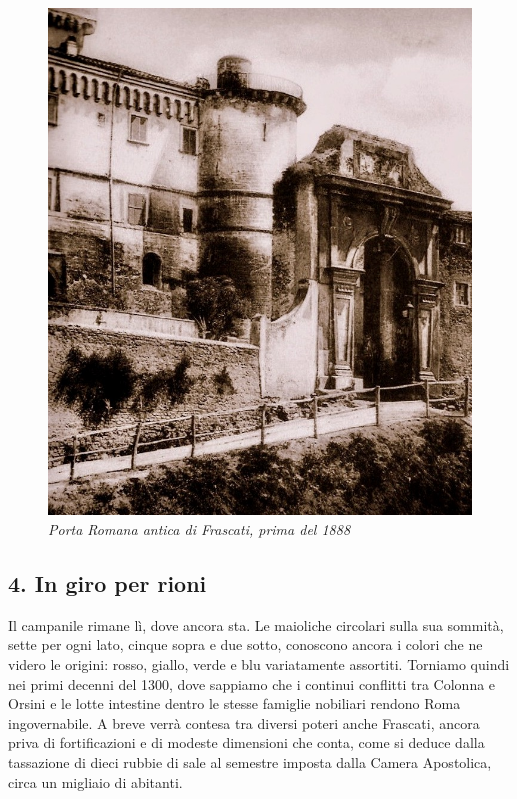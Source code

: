 \documentclass[
  letterpaper,
  DIV=11,
  numbers=noendperiod]{scrartcl}
\begin{document}
\begin{figure}

{\centering \includegraphics{../../images/2024/san_rocco/5porta_romana-antica.jpeg}

}

\caption{\emph{Porta Romana antica di Frascati, prima del 1888}}

\end{figure}

\hypertarget{in-giro-per-rioni}{%
\subsection{4. In giro per rioni}\label{in-giro-per-rioni}}

Il campanile rimane lì, dove ancora sta. Le maioliche circolari sulla
sua sommità, sette per ogni lato, cinque sopra e due sotto, conoscono
ancora i colori che ne videro le origini: rosso, giallo, verde e blu
variatamente assortiti. Torniamo quindi nei primi decenni del 1300, dove
sappiamo che i continui conflitti tra Colonna e Orsini e le lotte
intestine dentro le stesse famiglie nobiliari rendono Roma
ingovernabile. A breve verrà contesa tra diversi poteri anche Frascati,
ancora priva di fortificazioni e di modeste dimensioni che conta, come
si deduce dalla tassazione di dieci rubbie di sale al semestre imposta
dalla Camera Apostolica, circa un migliaio di abitanti.
\end{document}
